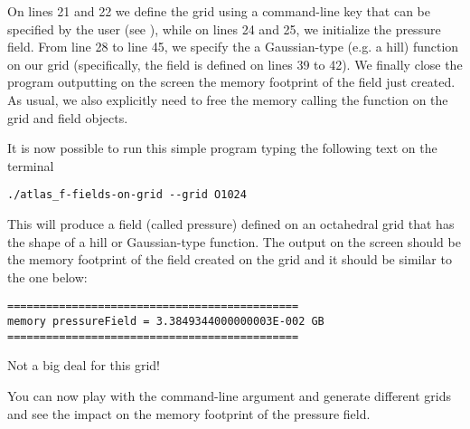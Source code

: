 On lines 21 and 22 we define the grid using a command-line key 
that can be specified by the user (see ), 
while on lines 24 and 25, we initialize the pressure field.
From line 28 to line 45, we specify the a Gaussian-type 
(e.g. a hill) function on our grid (specifically, the 
field is defined on lines 39 to 42).
We finally close the program outputting on the screen 
the memory footprint of the field just created. As usual,
we also explicitly need to free the memory calling the 
function  on the grid and field objects.

It is now possible to run this simple program typing
the following text on the terminal
%
\begin{lstlisting}[style=BashStyle]
./atlas_f-fields-on-grid --grid O1024
\end{lstlisting}
% 
This will produce a field (called pressure) defined 
on an octahedral grid that has the shape of a hill 
or Gaussian-type function.
The output on the screen should be the memory footprint 
of the field created on the grid and it should be similar 
to the one below:
%
\begin{lstlisting}[style=BashStyle]
=============================================
memory pressureField = 3.3849344000000003E-002 GB
=============================================
\end{lstlisting}
% 
Not a big deal for this grid!

You can now play with the command-line argument and 
generate different grids and see the impact on the 
memory footprint of the pressure field.
